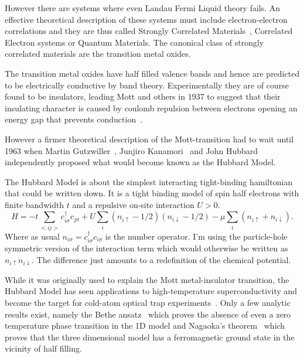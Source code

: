 However there are systems where even Landau Fermi Liquid theory fails. An effective theoretical description of these systems must include electron-electron correlations and they are thus called Strongly Correlated Materials~\autocite{morosanStronglyCorrelatedMaterials2012}, Correlated Electron systems or Quantum Materials. The canonical class of strongly correlated materials are the transition metal oxides.

The transition metal oxides have half filled valence bands and hence are predicted to be electrically conductive by band theory. Experimentally they are of course found to be insulators, leading Mott and others in 1937 to suggest that their insulating character is caused by coulomb repulsion between electrons opening an energy gap that prevents conduction~\autocite{mottDiscussionPaperBoer1937}.

However a firmer theoretical description of the Mott-transition had to wait until 1963 when Martin Gutzwiller~\autocite{gutzwillerEffectCorrelationFerromagnetism1963}, Junjiro Kanamori~\autocite{kanamoriElectronCorrelationFerromagnetism1963} and John Hubbard~\autocite{hubbardj.ElectronCorrelationsNarrow1963} independently proposed what would become known as the Hubbard Model.

The Hubbard Model is about the simplest interacting tight-binding hamiltonian that could be written down. It is a tight binding model of spin half electrons with finite bandwidth \(t\) and a repulsive on-site interaction \(U > 0\). \[H = -t\sum_{<ij>}c^\dag_{i\sigma}c_{j\sigma} + U \sum_{i} (n_{i \uparrow} - 1/2)( n_{i\downarrow} - 1/2) - \mu \sum_i \left( n_{i \uparrow} + n_{i \downarrow} \right).\] Where as usual \(n_{i \sigma} = c^\dag_{i\sigma}c_{i\sigma}\) is the number operator. I'm using the particle-hole symmetric version of the interaction term which would otherwise be written as \(n_{i \uparrow} n_{i\downarrow}\). The difference just amounts to a redefinition of the chemical potential.

While it was originally used to explain the Mott metal-insulator transition, the Hubbard Model has seen applications to high-temperature superconductivity and become the target for cold-atom optical trap experiments~\autocite{noauthor_hubbard_2013,greiner_quantum_2002,jordens_mott_2008}. Only a few analytic results exist, namely the Bethe ansatz~\autocite{lieb_absence_1968} which proves the absence of even a zero temperature phase transition in the 1D model and Nagaoka's theorem~\autocite{nagaoka_ferromagnetism_1966} which proves that the three dimensional model has a ferromagnetic ground state in the vicinity of half filling.

